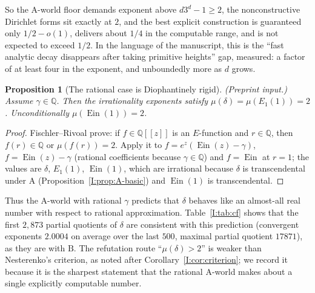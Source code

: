 \documentclass[11pt,a4paper]{article}
\newcommand{\Q}{\mathbb Q}
\newcommand{\Ein}{\operatorname{Ein}}
\newtheorem{proposition}[theorem]{Proposition}
\theoremstyle{definition}
\theoremstyle{remark}
\numberwithin{equation}{section}
\begin{document}
So the $\mathrm A$-world floor demands exponent above $d3^d-1\ge2$, the nonconstructive
Dirichlet forms sit exactly at $2$, and the best explicit construction is guaranteed only
$1/2-o(1)$, delivers about $1/4$ in the computable range, and is not expected to exceed
$1/2$. In the language of the
manuscript, this is the ``fast analytic decay disappears after taking primitive heights''
gap, measured: a factor of at least four in the exponent, and unboundedly more as $d$ grows.

\begin{proposition}[The rational case is Diophantinely rigid]\label{I:prop:rational}
\textup{(Preprint input.)} Assume $\gamma\in\Q$. Then the irrationality exponents satisfy
$\mu(\delta)=\mu(E_1(1))=2$. Unconditionally $\mu(\Ein(1))=2$.
\end{proposition}
\begin{proof}
Fischler--Rivoal \cite[Thm.~1]{FRexponent} prove: if $f\in\Q[[z]]$ is an $E$-function and
$r\in\Q$, then $f(r)\in\Q$ or $\mu(f(r))=2$. Apply it to $f=e^z(\Ein(z)-\gamma)$,
$f=\Ein(z)-\gamma$ (rational coefficients because $\gamma\in\Q$) and $f=\Ein$ at $r=1$;
the values are $\delta$, $E_1(1)$, $\Ein(1)$, which are irrational because
$\delta$ is transcendental under $\mathrm A$ (Proposition~\ref{I:prop:A-basic}) and
$\Ein(1)$ is transcendental.
\end{proof}

Thus the $\mathrm A$-world with rational $\gamma$ predicts that $\delta$ behaves like an
almost-all real number with respect to rational approximation. Table~\ref{I:tab:cf} shows
that the first $2{,}873$ partial quotients of $\delta$ are consistent with this prediction
(convergent exponents $2.0004$ on average over the last $500$, maximal partial quotient
$17871$), as they are with $\mathrm B$. The refutation route ``$\mu(\delta)>2$'' is weaker
than Nesterenko's criterion, as noted after Corollary~\ref{I:cor:criterion}; we record it
because it is the sharpest statement that the rational $\mathrm A$-world makes about a single
explicitly computable number.
\end{document}
